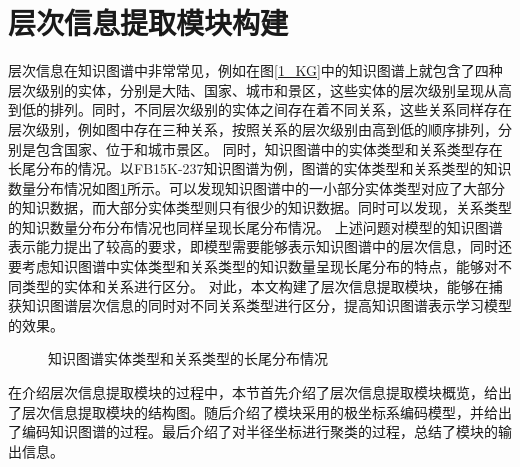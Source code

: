 \documentclass[algorithmlist, AutoFakeBold, AutoFakeSlant, figurelist, tablelist, nomlist, engineering]{seuthesix}
\begin{document}
\section{层次信息提取模块构建}
层次信息在知识图谱中非常常见，例如在图\ref{1_KG}中的知识图谱上就包含了四种层次级别的实体，分别是大陆、国家、城市和景区，这些实体的层次级别呈现从高到低的排列。同时，不同层次级别的实体之间存在着不同关系，这些关系同样存在层次级别，例如图中存在三种关系，按照关系的层次级别由高到低的顺序排列，分别是包含国家、位于和城市景区。
同时，知识图谱中的实体类型和关系类型存在长尾分布的情况。以FB15K-237知识图谱为例，图谱的实体类型和关系类型的知识数量分布情况如图\ref{2_LongTail}所示。可以发现知识图谱中的一小部分实体类型对应了大部分的知识数据，而大部分实体类型则只有很少的知识数据。同时可以发现，关系类型的知识数量分布分布情况也同样呈现长尾分布情况。
上述问题对模型的知识图谱表示能力提出了较高的要求，即模型需要能够表示知识图谱中的层次信息，同时还要考虑知识图谱中实体类型和关系类型的知识数量呈现长尾分布的特点，能够对不同类型的实体和关系进行区分。
对此，本文构建了层次信息提取模块，能够在捕获知识图谱层次信息的同时对不同关系类型进行区分，提高知识图谱表示学习模型的效果。
\begin{figure}
  \centering
  \caption{知识图谱实体类型和关系类型的长尾分布情况}
  \label{2_LongTail}
\end{figure}

在介绍层次信息提取模块的过程中，本节首先介绍了层次信息提取模块概览，给出了层次信息提取模块的结构图。随后介绍了模块采用的极坐标系编码模型，并给出了编码知识图谱的过程。最后介绍了对半径坐标进行聚类的过程，总结了模块的输出信息。
\end{document}
